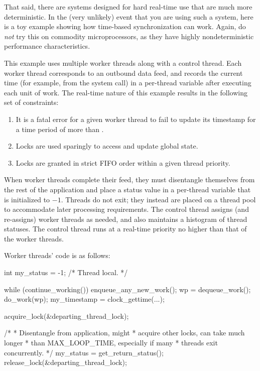 {{	That said, there are systems designed for hard real-time use
	that are much more deterministic.
	In the (very unlikely) event that you are using such a system,
	here is a toy example showing how time-based synchronization can
	work.
	Again, do \emph{not} try this on commodity microprocessors,
	as they have highly nondeterministic performance characteristics.

	This example uses multiple worker threads along with a control
	thread.
	Each worker thread corresponds to an outbound data feed, and
	records the current time (for example, from the
	 system call) in a per-thread
	 variable after executing each unit
	of work.
	The real-time nature of this example results in the following
	set of constraints:

	\begin{enumerate}
	\item	It is a fatal error for a given worker thread to fail
		to update its timestamp for a time period of more than
		.
	\item	Locks are used sparingly to access and update global
		state.
	\item	Locks are granted in strict FIFO order within
		a given thread priority.
	\end{enumerate}

	When worker threads complete their feed, they must disentangle
	themselves from the rest of the application and place a status
	value in a per-thread  variable that is initialized
	to $-1$.
	Threads do not exit; they instead are placed on a thread pool
	to accommodate later processing requirements.
	The control thread assigns (and re-assigns) worker threads as
	needed, and also maintains a histogram of thread statuses.
	The control thread runs at a real-time priority no higher than
	that of the worker threads.

	Worker threads' code is as follows:

\begin{VerbatimN}
	int my_status = -1;  /* Thread local. */

	while (continue_working()) {
		enqueue_any_new_work();
		wp = dequeue_work();
		do_work(wp);
		my_timestamp = clock_gettime(...);
	}

	acquire_lock(&departing_thread_lock);

	/*
	 * Disentangle from application, might
	 * acquire other locks, can take much longer
	 * than MAX_LOOP_TIME, especially if many
	 * threads exit concurrently.
	 */
	my_status = get_return_status();
	release_lock(&departing_thread_lock);


\end{VerbatimN}}}
